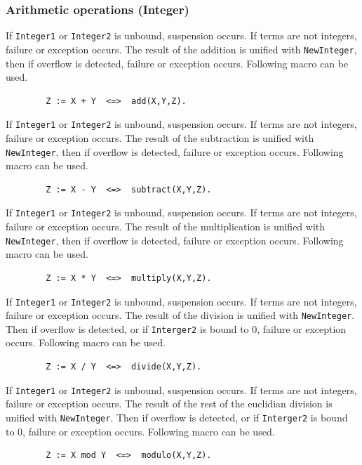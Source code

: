 \subsubsection{Arithmetic operations (Integer)}
\begin{itemize}

If \verb|Integer1| or \verb|Integer2| is unbound, suspension occurs.
If terms are not integers, failure or exception occurs.
The result of the addition is unified with \verb|NewInteger|, then
if overflow is detected, failure or exception occurs.
Following macro can be used.
\begin{verbatim}
        Z := X + Y  <=>  add(X,Y,Z).
\end{verbatim}

\index{\verb|+|}
If \verb|Integer1| or \verb|Integer2| is unbound, suspension occurs.
If terms are not integers, failure or exception occurs.
The result of the subtraction is unified with \verb|NewInteger|, then
if overflow is detected, failure or exception occurs.
Following macro can be used.
\begin{verbatim}
        Z := X - Y  <=>  subtract(X,Y,Z).
\end{verbatim}

\index{\verb|-|}
If \verb|Integer1| or \verb|Integer2| is unbound, suspension occurs.
If terms are not integers, failure or exception occurs.
The result of the multiplication is unified with \verb|NewInteger|, then
if overflow is detected, failure or exception occurs.
Following macro can be used.
\begin{verbatim}
        Z := X * Y  <=>  multiply(X,Y,Z).
\end{verbatim}

\index{\verb|*|}
If \verb|Integer1| or \verb|Integer2| is unbound, suspension occurs.
If terms are not integers, failure or exception occurs.
The result of the division is unified with \verb|NewInteger|.
Then if overflow is detected, or if \verb|Interger2| is bound to 0, 
failure or exception occurs. Following macro can be used.
\begin{verbatim}
        Z := X / Y  <=>  divide(X,Y,Z).
\end{verbatim}

\index{\verb|/|}
If \verb|Integer1| or \verb|Integer2| is unbound, suspension occurs.
If terms are not integers, failure or exception occurs.
The result of the rest of the euclidian division is unified with 
\verb|NewInteger|. 
Then if overflow is detected, or if \verb|Interger2| is bound to 0, 
failure or exception occurs. Following macro can be used.
\begin{verbatim}
        Z := X mod Y  <=>  modulo(X,Y,Z).
\end{verbatim}


\end{itemize}
